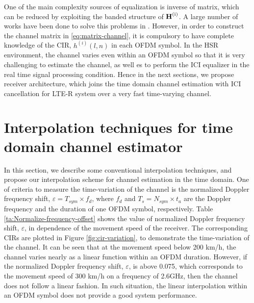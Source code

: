 \documentclass[AMA]{WileyNJD-v1}
\begin{document}
One of the main complexity sources of equalization is inverse of matrix, which can be reduced by exploiting  the banded structure of $\rm{\textbf H^{(i)}}$. A large number of works have been done to solve this problems in \cite{Hsu2009, Liu2012, Schniter2004, Fang2007}. However, in order to construct the channel matrix in \eqref{eq:matrix-channel}, it is compulsory to have complete knowledge of the CIR, $h^{(i)}(l,n)$ in each OFDM symbol. In the HSR environment, the channel varies even within an OFDM symbol so that it is very challenging to estimate the channel, as well es to perform the ICI equalizer in the real time signal processing condition. Hence in the next sections, we propose receiver architecture, which joins the  time domain channel estimation with ICI cancellation for LTE-R system over a very fast time-varying channel.
	
\section{Interpolation techniques for time domain channel estimator}\label{section-3}
	
In this section, we describe some conventional interpolation techniques, and propose our interpolation scheme for channel estimation in the time domain. One of criteria to measure the time-variation of the channel is the normalized Doppler frequency shift, $\varepsilon = T_{sym}\times f_{d}$, where $f_{d}$ and $T_{s}=N_{sym}\times t_{a}$ are the Doppler frequency and the duration of one OFDM symbol, respectively. Table \ref{ta:Normalize-frequency-offset} shows the value of normalized Doppler frequency shift, $\varepsilon$, in dependence of the movement speed of the receiver. The corresponding CIRs are plotted in Figure \ref{fig:cir-variation}, to demonstrate the time-variation of the channel. It can be seen that at the movement speed below 200 km/h, the channel varies nearly as a linear function  within an OFDM duration. However,  if the normalized Doppler frequency shift, $\varepsilon$, is above 0.075, which corresponds to the movement speed of 300 km/h on a frequency of 2.6GHz, then the channel does not follow a linear fashion. In such situation, the linear interpolation within an OFDM symbol does not provide a good system performance.
	
\end{document}
